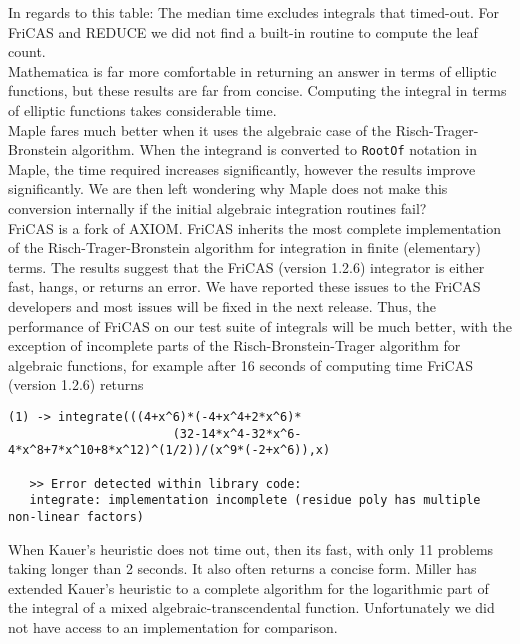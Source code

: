 \documentclass[12pt]{article}
\numberwithin{equation}{section}
\theoremstyle{definition}
\begin{document}
In regards to this table: The median time excludes integrals that timed-out. For 
FriCAS and REDUCE we did not find a built-in routine to compute the leaf count. \\

Mathematica is far more comfortable in returning an answer in terms of elliptic 
functions, but these results are far from concise. Computing the integral in 
terms of elliptic functions takes considerable time. \\

Maple fares much better when it uses the algebraic case of the Risch-Trager-Bronstein 
algorithm. When the integrand is converted to \texttt{RootOf} notation in Maple, 
the time required increases significantly, however the results improve significantly. 
We are then left wondering why Maple does not make this conversion internally if 
the initial algebraic integration routines fail? \\

FriCAS is a fork of AXIOM. FriCAS inherits the most complete implementation of the 
Risch-Trager-Bronstein algorithm for integration in finite (elementary) terms. The 
results suggest that the FriCAS (version 1.2.6) integrator is either fast, hangs, or 
returns an error. We have reported these issues to the FriCAS developers and most 
issues will be fixed in the next release\cite{fricas_sci.math.symbolic}. Thus, the 
performance of FriCAS on our test suite of integrals will be much better, with the 
exception of incomplete parts of the Risch-Bronstein-Trager algorithm for algebraic 
functions, for example after 16 seconds of computing time FriCAS (version 1.2.6) returns \\

\footnotesize
\begin{verbatim}
(1) -> integrate(((4+x^6)*(-4+x^4+2*x^6)*
                       (32-14*x^4-32*x^6-4*x^8+7*x^10+8*x^12)^(1/2))/(x^9*(-2+x^6)),x)
 
   >> Error detected within library code:
   integrate: implementation incomplete (residue poly has multiple non-linear factors)
\end{verbatim}
\normalsize

When Kauer's heuristic does not time out, then its fast, with only 11 problems taking 
longer than 2 seconds. It also often returns a concise form. Miller\cite{Miller2012} 
has extended Kauer's heuristic to a complete algorithm for the logarithmic part of 
the integral of a mixed algebraic-transcendental function. Unfortunately we did not 
have access to an implementation for comparison. \\
\end{document}
